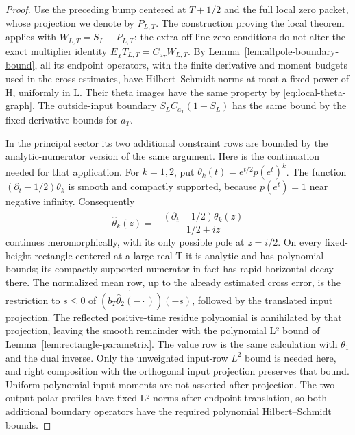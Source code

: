 \begin{proof}
Use the preceding bump centered at $T+1/2$ and the full local
zero packet, whose projection we denote by $P_{L,T}$.
The construction proving the local theorem applies with
$W_{L,T}=S_L-P_{L,T}$: the extra off-line zero conditions do not
alter the exact multiplier identity $E_\chi T_{L,T}=C_{a_T}W_{L,T}$.
By Lemma~\ref{lem:allpole-boundary-bound}, all its endpoint
operators, with the finite derivative and moment budgets used in
the cross estimates, have Hilbert--Schmidt norms at most a fixed
power of H, uniformly in L.  Their theta images have the same
property by \eqref{eq:local-theta-graph}.
The outside-input boundary $S_LC_{a_T}(1-S_L)$ has the same bound
by the fixed derivative bounds for $a_T$.

In the principal sector its two additional constraint rows are
bounded by the analytic-numerator version of the same argument.
Here is the continuation needed for that application.
For $k=1,2$, put $\theta_k(t)=e^{t/2}p(e^t)^k$.
The function $(\partial_t-1/2)\theta_k$ is smooth and compactly
supported, because $p(e^t)=1$ near negative infinity.
Consequently
\[
 \widehat\theta_k(z)=
 -\frac{\widehat{(\partial_t-1/2)\theta_k}(z)}{1/2+iz}
\]
continues meromorphically, with its only possible pole at $z=i/2$.
On every fixed-height rectangle centered at a large real T it is
analytic and has polynomial bounds; its compactly supported
numerator in fact has rapid horizontal decay there.
The normalized mean row, up to the already estimated cross error,
is the restriction to $s\leq0$ of
$\check{(b_T\widehat\theta_2(-\cdot))}(-s)$, followed by the
translated input projection.  The reflected positive-time residue
polynomial is annihilated by that projection, leaving the smooth
remainder with the polynomial L² bound of
Lemma~\ref{lem:rectangle-parametrix}.  The value row is the same
calculation with $\theta_1$ and the dual inverse.
Only the unweighted input-row $L^2$ bound is needed here, and right
composition with the orthogonal input projection preserves that bound.
Uniform polynomial input moments are not asserted after projection.
The two output polar profiles have fixed L² norms after endpoint
translation, so both additional boundary operators have the
required polynomial Hilbert--Schmidt bounds.


\end{proof}
